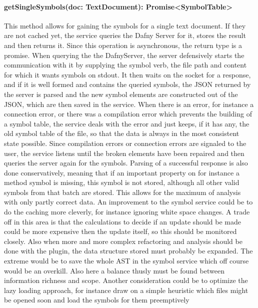 \paragraph{getSingleSymbols(doc: TextDocument): Promise<SymbolTable>} This method allows for gaining the symbols for a single text document. If they are not cached yet, the service queries the Dafny Server for it, stores the result and then returns it. Since this operation is asynchronous, the return type is a promise.
\newline
When querying the the DafnyServer, the server defensively starts the communication with it by supplying the symbol verb, the file path and content for which it wants symbols on stdout. It then waits on the socket for a response, and if it is well formed and contains the queried symbols, the JSON returned by the server is parsed and the new symbol elements are constructed out of the JSON, which are then saved in the service. \newline
When there is an error, for instance a connection error, or there was a compilation error which prevents the building of a symbol table, the service deals with the error and just keeps, if it has any, the old symbol table of the file, so that the data is always in the most consistent state possible. Since compilation errors or connection errors are signaled to the user, the service listens until the broken elements have been repaired and then queries the server again for the symbols. \newline
Parsing of a successful response is also done conservatively, meaning that if an important property on for instance a method symbol is missing, this symbol is not stored, although all other valid symbols from that batch are stored. This allows for the maximum of analysis with only partly correct data. \newline
An improvement to the symbol service could be to do the caching more cleverly, for instance ignoring white space changes. A trade off in this area is that the calculations to decide if an update should be made could be more expensive then the update itself, so this should be monitored closely. Also when more and more complex refactoring and analysis should be done with the plugin, the data structure stored must probably be expanded. The extreme would be to save the whole AST in the symbol service which off course would be an overkill. Also here a balance thusly must be found between information richness and scope. Another consideration could be to optimize the lazy loading approach, for instance draw on a simple heuristic which files might be opened soon and load the symbols for them preemptively\newline
